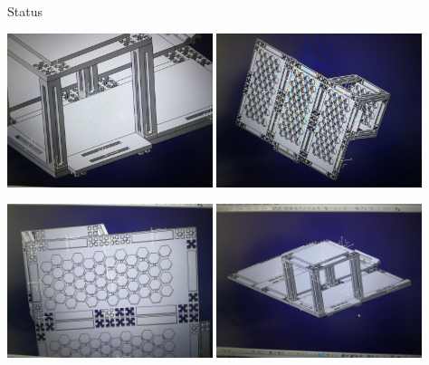 \documentclass{beamer}
\begin{document}
\begin{frame}{Status}

\begin{center}
    \includegraphics[width=0.45\textwidth]{fig_kniffelbot_5}
    \includegraphics[width=0.45\textwidth]{fig_kniffelbot_6}
    
    \includegraphics[width=0.45\textwidth]{fig_kniffelbot_7}
    \includegraphics[width=0.45\textwidth]{fig_kniffelbot_8}
\end{center}

\end{frame}
\end{document}
